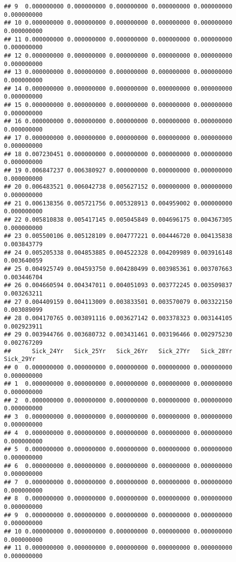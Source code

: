 \documentclass[
]{article}
\begin{document}
\begin{verbatim}
## 9  0.000000000 0.000000000 0.000000000 0.000000000 0.000000000 0.000000000
## 10 0.000000000 0.000000000 0.000000000 0.000000000 0.000000000 0.000000000
## 11 0.000000000 0.000000000 0.000000000 0.000000000 0.000000000 0.000000000
## 12 0.000000000 0.000000000 0.000000000 0.000000000 0.000000000 0.000000000
## 13 0.000000000 0.000000000 0.000000000 0.000000000 0.000000000 0.000000000
## 14 0.000000000 0.000000000 0.000000000 0.000000000 0.000000000 0.000000000
## 15 0.000000000 0.000000000 0.000000000 0.000000000 0.000000000 0.000000000
## 16 0.000000000 0.000000000 0.000000000 0.000000000 0.000000000 0.000000000
## 17 0.000000000 0.000000000 0.000000000 0.000000000 0.000000000 0.000000000
## 18 0.007230451 0.000000000 0.000000000 0.000000000 0.000000000 0.000000000
## 19 0.006847237 0.006380927 0.000000000 0.000000000 0.000000000 0.000000000
## 20 0.006483521 0.006042738 0.005627152 0.000000000 0.000000000 0.000000000
## 21 0.006138356 0.005721756 0.005328913 0.004959002 0.000000000 0.000000000
## 22 0.005810838 0.005417145 0.005045849 0.004696175 0.004367305 0.000000000
## 23 0.005500106 0.005128109 0.004777221 0.004446720 0.004135838 0.003843779
## 24 0.005205338 0.004853885 0.004522328 0.004209989 0.003916148 0.003640059
## 25 0.004925749 0.004593750 0.004280499 0.003985361 0.003707663 0.003446704
## 26 0.004660594 0.004347011 0.004051093 0.003772245 0.003509837 0.003263211
## 27 0.004409159 0.004113009 0.003833501 0.003570079 0.003322150 0.003089099
## 28 0.004170765 0.003891116 0.003627142 0.003378323 0.003144105 0.002923911
## 29 0.003944766 0.003680732 0.003431461 0.003196466 0.002975230 0.002767209
##      Sick_24Yr   Sick_25Yr   Sick_26Yr   Sick_27Yr   Sick_28Yr   Sick_29Yr
## 0  0.000000000 0.000000000 0.000000000 0.000000000 0.000000000 0.000000000
## 1  0.000000000 0.000000000 0.000000000 0.000000000 0.000000000 0.000000000
## 2  0.000000000 0.000000000 0.000000000 0.000000000 0.000000000 0.000000000
## 3  0.000000000 0.000000000 0.000000000 0.000000000 0.000000000 0.000000000
## 4  0.000000000 0.000000000 0.000000000 0.000000000 0.000000000 0.000000000
## 5  0.000000000 0.000000000 0.000000000 0.000000000 0.000000000 0.000000000
## 6  0.000000000 0.000000000 0.000000000 0.000000000 0.000000000 0.000000000
## 7  0.000000000 0.000000000 0.000000000 0.000000000 0.000000000 0.000000000
## 8  0.000000000 0.000000000 0.000000000 0.000000000 0.000000000 0.000000000
## 9  0.000000000 0.000000000 0.000000000 0.000000000 0.000000000 0.000000000
## 10 0.000000000 0.000000000 0.000000000 0.000000000 0.000000000 0.000000000
## 11 0.000000000 0.000000000 0.000000000 0.000000000 0.000000000 0.000000000

\end{verbatim}
\end{document}
